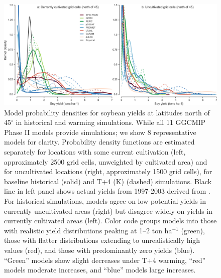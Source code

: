 \documentclass[gmd, manuscript]{copernicus} %
\begin{document}
\begin{figure}[ht]
\centering
   \includegraphics[width=15cm]{figures/soy_highlats.png}
\caption{
  Model probability densities for soybean yields at latitudes north of 45$^\circ$ in historical and warming simulations. 
  While all 11 GGCMIP Phase II models provide simulations; we show 8 representative models for clarity.
  Probability density functions are estimated separately for locations with some current cultivation (left, approximately 2500 grid cells, unweighted by cultivated area) and for uncultivated locations (right, approximately 1500 grid cells), for baseline historical (solid) and T+4 (K) (dashed) simulations. 
  Black line in left panel shows actual yields from 1997-2003 derived from \cite{Ray2012}. 
  For historical simulations, models agree on low potential yields in currently uncultivated areas (right) but disagree widely on yields in currently cultivated areas (left). 
  Color code groups models into those with realistic yield distributions peaking at 1--2 ton ha$^{-1}$ (green), those with flatter distributions extending to unrealistically high values (red), and those with predominantly zero yields (blue). 
  “Green” models show slight decreases under T+4 warming, “red” models moderate increases, and “blue” models large increases. 
}
\label{fig:highlat}
\end{figure}
\end{document}
